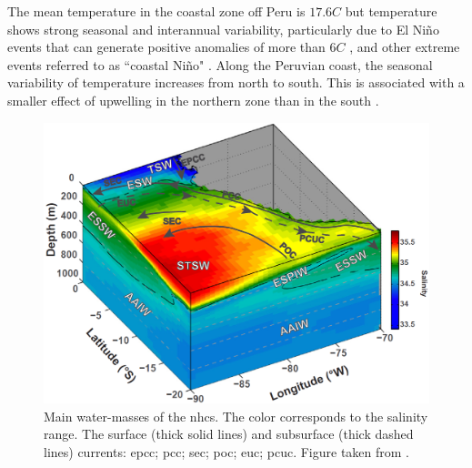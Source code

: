The mean temperature in the coastal zone off Peru is $17.6$\textdegree $C$ \citep{MontPurc2003} but temperature shows strong seasonal and interannual variability, particularly due to El Ni\~{n}o events that can generate positive anomalies of more than $6$\textdegree $C$  \citep{BraiMcla1987,SancCali2000,CaiBorl2014,CaiWang2017,CaiWang2018,FreuHenl2019}, and other extreme events referred to as ``coastal Ni\~{n}o" \citep{EcheCola2018,Garr2018,HuHuan2019,RodrDiaz2019,TakaMart2019}. Along the Peruvian coast, the seasonal variability of temperature increases from north to south. This is associated with a smaller effect of upwelling in the northern zone than in the south \citep{BraiMcla1987}.\\

\begin{figure}[H]
	\includegraphics[width=1.0\textwidth]{figures/Chap1WaterMassesNHCS.png}
	\centering
	\caption{Main water-masses of the \acrshort{nhcs}. The color corresponds to the salinity range. The surface (thick solid lines) and subsurface (thick dashed lines) currents: \acrfull{epcc}; \acrfull{pcc}; \acrfull{sec}; \acrfull{poc}; \acrfull{euc}; \acrfull{pcuc}. Figure taken from \cite{GradChai2018}.}
	\label{Chap1WaterMassesNHCS}
\end{figure}

